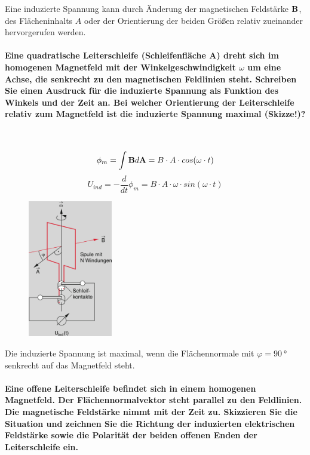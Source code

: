 \documentclass[a4paper, 11pt, ngerman, parskip=half-]{scrartcl}
\begin{document}
Eine induzierte Spannung kann durch Änderung der magnetischen Feldstärke $\bold{B}$, des
Flächeninhalts $A$ oder der Orientierung der beiden Größen relativ zueinander hervorgerufen werden.

\paragraph{Eine quadratische Leiterschleife (Schleifenfläche A) dreht sich im homogenen Magnetfeld
    mit der Winkelgeschwindigkeit $\omega$ um eine Achse, die senkrecht zu den magnetischen Feldlinien
    steht. Schreiben Sie einen Ausdruck für die induzierte Spannung als Funktion des Winkels und der
    Zeit an. Bei welcher Orientierung der Leiterschleife relativ zum Magnetfeld ist die induzierte
    Spannung maximal (Skizze!)?} ~

\begin{equation}
    \phi_m = \int \bold{B} d\bold{A} = B \cdot A \cdot cos(\omega \cdot t)
\end{equation}
\begin{equation}
    U_{ind} = - \frac{d}{dt} \phi_m = B \cdot A \cdot \omega \cdot sin(\omega \cdot t)
\end{equation}

\begin{figure}[H]
    \centering
    \includegraphics[height=6cm]{image/07/2.1}
\end{figure}

Die induzierte Spannung ist maximal, wenn die Flächennormale mit $\varphi = \SI{90}{\degree}$
senkrecht auf das Magnetfeld steht.

\paragraph{Eine offene Leiterschleife befindet sich in einem homogenen Magnetfeld. Der
    Flächennormalvektor steht parallel zu den Feldlinien. Die magnetische Feldstärke nimmt mit der Zeit
    zu. Skizzieren Sie die Situation und zeichnen Sie die Richtung der induzierten elektrischen
    Feldstärke sowie die Polarität der beiden offenen Enden der Leiterschleife ein.} ~
\end{document}
